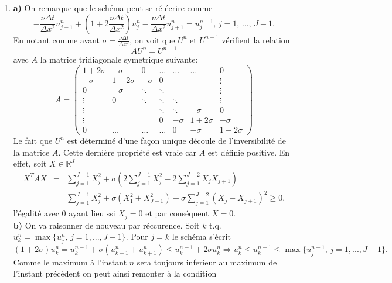 \documentclass[12pt,a4paper]{article}
\begin{document}
\begin{enumerate}
\item {\bf a)} On remarque que le sch\'ema peut se r\'e-\'ecrire comme
\begin{equation}\label{eq:schema2}
-\frac{\nu\Delta t}{\Delta x^2}u^n_{j-1} +
\left(1+2\frac{\nu\Delta t}{\Delta x^2}\right)u_j^n - \frac{\nu\Delta
  t}{\Delta x^2}u^n_{j+1} =u_j^{n-1},\,  j=1,\,\hdots,\, J-1.
\end{equation}
En notant comme avant $\sigma = \frac{\nu\Delta t}{\Delta x^2}$, on
voit que $U^n$ et $U^{n-1}$ v\'erifient la relation 
$$
AU^n = U^{n-1}
$$ 
avec $A$ la matrice tridiagonale symetrique suivante:
\begin{equation}
A = \left(\begin{array}{ccccccc}
1+2\sigma & -\sigma & 0 & \hdots & \hdots & \hdots & 0\\
-\sigma & 1+2\sigma & -\sigma & 0 & & & \vdots \\
0 & -\sigma & \ddots & \ddots & & & \vdots \\
\vdots & 0 & \ddots & \ddots & \ddots & & \vdots \\
\vdots & & & \ddots & \ddots & -\sigma & 0 \\
\vdots & & & 0 & -\sigma & 1+2\sigma & -\sigma \\
0 & \hdots & \hdots & \hdots & 0& -\sigma & 1+2\sigma
\end{array}\right)
\end{equation}
Le fait que $U^n$ est d\'etermin\'e d'une fa\c{c}on unique d\'ecoule
de l'inversibilit\'e de la matrice $A$. Cette derni\`ere propri\'et\'e
est vraie car $A$ est d\'efinie positive. En effet, soit $X\in
\mathbb{R}^J$ 
$$
\begin{array}{rcl}
X^TAX &= &\displaystyle \sum_{j=1}^{J-1} X_j^2 +\sigma\left(2\sum_{j=1}^{J-1} X_j^2-2
  \sum_{j=1}^{J-2} X_jX_{j+1}\right) \\[2ex]
  &=& \displaystyle\sum_{j=1}^{J-1}
X_j^2+\sigma (X_1^2+X_{J-1}^2)+\sigma\sum_{j=1}^{J-2}(X_j-X_{j+1})^2 \ge 0.
\end{array}
$$
l'\'egalit\'e avec $0$ ayant lieu ssi $X_j=0$ et par cons\'equent $X=0$.\\
{\bf b)} On va raisonner de nouveau par r\'eccurence. Soit $k$
t.q. $u_k^n =\max \{u_j^n,\, j = 1,...,J-1\}$. Pour $j=k$ le
sch\'ema s'\'ecrit
$$
(1+2\sigma)u_k^n = u_k^{n-1} + \sigma (u_{k-1}^n+u_{k+1}^n) \le
u_k^{n-1} +2\sigma u_k^n \Rightarrow u_k^n \le u_k^{n-1} \le \max \{u_j^{n-1},\,j = 1,...,J-1\}.
$$ 
Comme le maximum \`a l'instant $n$ sera toujours inferieur au maximum
de l'instant pr\'ec\'edent on peut ainsi remonter \`a la condition

\end{enumerate}
\end{document}
